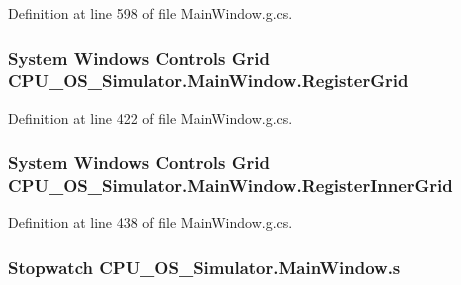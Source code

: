Definition at line 598 of file Main\+Window.\+g.\+cs.

\hypertarget{class_c_p_u___o_s___simulator_1_1_main_window_a37acb139db0aa54950350fdb47dfd452}{}
\subsubsection[{Register\+Grid}]{\setlength{\rightskip}{0pt plus 5cm}System Windows Controls Grid C\+P\+U\+\_\+\+O\+S\+\_\+\+Simulator.\+Main\+Window.\+Register\+Grid\hspace{0.3cm}{\ttfamily [package]}}\label{class_c_p_u___o_s___simulator_1_1_main_window_a37acb139db0aa54950350fdb47dfd452}


Definition at line 422 of file Main\+Window.\+g.\+cs.

\hypertarget{class_c_p_u___o_s___simulator_1_1_main_window_a27d2d9e2ed92e2daa444ca8086a0861e}{}
\subsubsection[{Register\+Inner\+Grid}]{\setlength{\rightskip}{0pt plus 5cm}System Windows Controls Grid C\+P\+U\+\_\+\+O\+S\+\_\+\+Simulator.\+Main\+Window.\+Register\+Inner\+Grid\hspace{0.3cm}{\ttfamily [package]}}\label{class_c_p_u___o_s___simulator_1_1_main_window_a27d2d9e2ed92e2daa444ca8086a0861e}


Definition at line 438 of file Main\+Window.\+g.\+cs.

\hypertarget{class_c_p_u___o_s___simulator_1_1_main_window_a880dc01f7c4f093b77ace064d93be1f3}{}
\subsubsection[{s}]{\setlength{\rightskip}{0pt plus 5cm}Stopwatch C\+P\+U\+\_\+\+O\+S\+\_\+\+Simulator.\+Main\+Window.\+s\hspace{0.3cm}{\ttfamily [private]}}\label{class_c_p_u___o_s___simulator_1_1_main_window_a880dc01f7c4f093b77ace064d93be1f3}


